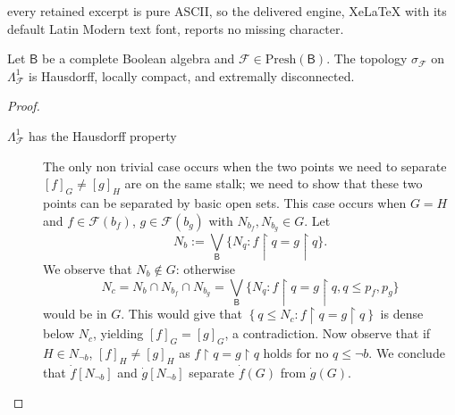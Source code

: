 \documentclass[10pt,a4paper]{amsart}
\newcommand{\F}{\mathcal{F}}
\newcommand{\Presh}{\textrm{Presh}}
\newcommand{\bool}[1]{\mathsf{#1}}
\newcommand{\bp}[1]{\left\lbrace #1 \right\rbrace}
\begin{document}
every retained excerpt is pure ASCII, so the delivered engine, XeLaTeX with its default Latin Modern text font, reports no missing character.
\begin{theorem}
\label{fact:lambdahaus} \label{prop:lambdahaus}
Let $\bool{B}$ be a complete Boolean algebra and $\F\in\Presh(\bool{B})$.
The topology $\sigma_\F$ on $\Lambda^1_\F$ is Hausdorff,  locally compact, and extremally disconnected.
 \end{theorem}

 \begin{proof}
\emph{}

\begin{description}
\item[$\Lambda^1_\F$ has the Hausdorff property]
The only non trivial case occurs when the two points we need to separate $[f]_{G}\neq[g]_{H}$ are on the same stalk; we need to show that these two points can be separated by basic open sets. This case occurs when $G=H$ and $f\in\F(b_f)$, $g\in\F(b_g)$ with $N_{b_f},N_{b_g}\in G$. Let%
 \[
 N_b:=\bigvee_{\bool{B}}\{N_q: f\restriction q=g\restriction q\}.
 \]
 We observe that $N_b\notin G$: otherwise \[N_c=N_b\cap N_{b_f}\cap N_{b_g}=\bigvee_{\bool{B}}\{N_q: f\restriction q=g\restriction q, q\leq p_f, p_g\}
 \]
 would be in $G$. This would give that $\bp{q\leq N_c: f\restriction q=g\restriction q}$ is dense below $N_c$, yielding $[f]_{G}=[g]_{G}$, a contradiction.
 Now observe that if $H\in N_{\neg b}$, $[f]_{H}\neq [g]_{H}$ as 
 $ f\restriction q=g\restriction q$ holds for no $q\leq \neg b$. We conclude that $\dot{f}[N_{\neg b}]$ and $\dot{g}[N_{\neg b}]$ separate $\dot{f}(G)$ from $\dot{g}(G)$. 

\end{description}
\end{proof}
\end{document}
